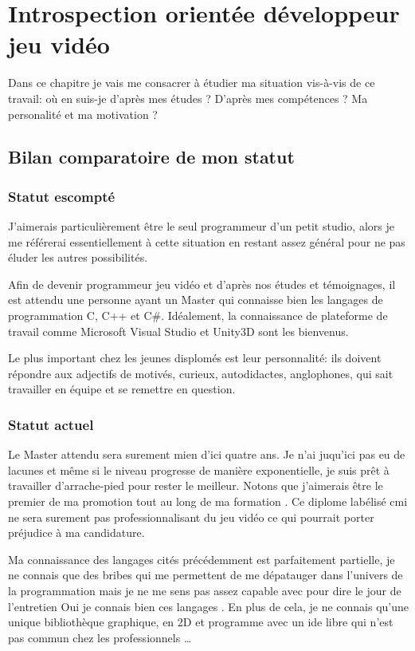 \documentclass[12pt, a4paper]{report} %
\begin{document}
\chapter{Introspection orientée développeur jeu vidéo}
Dans ce chapitre je vais me consacrer à étudier ma situation vis-à-vis de ce travail: où en suis-je d'après mes études ? D'après mes compétences ? Ma personalité et ma motivation ? 
\section{Bilan comparatoire de mon statut}
\subsection{Statut escompté}
J'aimerais particulièrement être le seul programmeur d'un petit studio, alors je me référerai essentiellement à cette situation en restant assez général pour ne pas éluder les autres possibilités.

Afin de devenir programmeur jeu vidéo et d'après nos études et témoignages, il est attendu une personne ayant un Master  qui connaisse bien les langages de programmation C, C++ et C\#{}. Idéalement, la connaissance de plateforme de travail comme Microsoft Visual Studio et Unity3D sont les bienvenus. 

Le plus important chez les jeunes displomés est leur personnalité: ils doivent répondre aux adjectifs de motivés, curieux, autodidactes, anglophones, qui sait travailler en équipe et  se remettre en question.

\subsection{Statut actuel}
Le Master attendu sera surement mien d'ici quatre ans. Je n'ai juqu'ici pas eu de lacunes et même si le niveau progresse de manière exponentielle, je suis prêt à travailler d'arrache-pied pour rester le meilleur. Notons que j'aimerais être le premier de ma promotion tout au long de ma formation . Ce diplome labélisé \acrshort{cmi} ne sera surement pas professionnalisant du jeu vidéo ce qui pourrait porter préjudice à ma candidature.

Ma connaissance des langages cités précédemment est parfaitement partielle, je ne connais que des bribes qui me permettent de me dépatauger dans l'univers de la programmation mais je ne me sens pas assez capable avec pour dire le jour de l'entretien \og Oui je connais bien ces langages \fg{}. En plus de cela, je ne connais qu'une unique bibliothèque graphique, en 2D et programme avec un \acrshort{ide} libre qui n'est pas commun chez les professionnels \dots{} 
\end{document}
